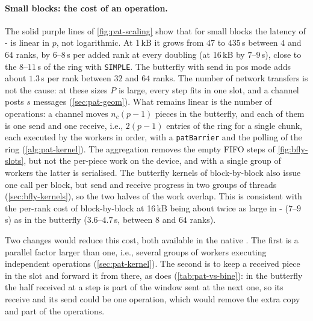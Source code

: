 \paragraph{Small blocks: the cost of an operation.}
The solid purple lines of \cref{fig:pat-scaling} show that for small blocks the latency of \bine{}-\pat{} is linear in $p$, not logarithmic.
At 1\,kB it grows from $47$ to $435$\,\textmu s between $4$ and $64$ ranks, by $6$--$8$\,\textmu s per added rank at every doubling (at 16\,kB by $7$--$9$\,\textmu s), close to the $8$--$11$\,\textmu s of the ring with \texttt{SIMPLE}. The butterfly with send in pos mode adds about $1.3$\,\textmu s per rank between $32$ and $64$ ranks.
The number of network transfers is not the cause: at these sizes $P$ is large, every step fits in one slot, and a channel posts $s$ messages (\cref{sec:pat-geom}).
What remains linear is the number of operations: a channel moves $n_c(p-1)$ pieces in the butterfly, and each of them is one send and one receive, i.e., $2(p-1)$ entries of the ring for a single chunk, each executed by the workers in order, with a \texttt{patBarrier} and the polling of the ring (\cref{alg:pat-kernel}).
The aggregation removes the empty FIFO steps of \cref{fig:bfly-slots}, but not the per-piece work on the device, and with a single group of workers the latter is serialised.
The butterfly kernels of block-by-block also issue one call per block, but send and receive progress in two groups of threads (\cref{sec:bfly-kernels}), so the two halves of the work overlap. This is consistent with the per-rank cost of block-by-block at 16\,kB being about twice as large in \bine{}-\pat{} ($7$--$9$\,\textmu s) as in the butterfly ($3.6$--$4.7$\,\textmu s, between $8$ and $64$ ranks).

Two changes would reduce this cost, both available in the native \pat{}.
The first is a parallel factor larger than one, i.e., several groups of workers executing independent operations (\cref{sec:pat-kernel}). The second is to keep a received piece in the slot and forward it from there, as \pat{} does (\cref{tab:pat-vs-bine}): in the butterfly the half received at a step is part of the window sent at the next one, so its receive and its send could be one operation, which would remove the extra copy and part of the operations.

